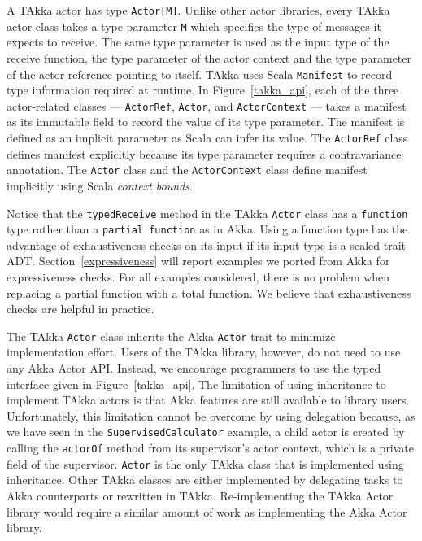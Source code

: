 A TAkka actor has type {\tt Actor[M]}.  Unlike other actor 
libraries, every TAkka actor class takes a type parameter {\tt M} which 
specifies the type of messages it expects to receive.  The same type parameter 
is used as the input type of the receive function, the type parameter of the 
actor context and the type parameter of the actor reference pointing to itself. 
TAkka uses Scala {\tt Manifest} to record type information required at runtime.
In Figure~\ref{takka_api}, each of the three actor-related classes ---
{\tt ActorRef}, {\tt Actor}, and {\tt ActorContext} --- takes a manifest as its
immutable field to record the value of its type parameter.
The manifest is defined as an implicit parameter as Scala can infer its value.
The {\tt ActorRef} class defines manifest explicitly because its
type parameter requires a contravariance annotation.  The {\tt Actor} class
and the {\tt ActorContext} class define manifest implicitly using
Scala {\it context bounds}.  

Notice that the {\tt typedReceive} method in the TAkka {\tt Actor}
class has a {\tt function} type rather than a {\tt partial function} as in Akka.
Using a function type has the advantage of exhaustiveness checks on its input if
its input type is a sealed-trait ADT.  Section~\ref{expressiveness} will report
examples we ported from Akka for expressiveness checks.  For all examples
considered, there is no problem when replacing a partial function with a total function.
We believe that exhaustiveness checks are helpful
in practice.

The TAkka {\tt Actor} class inherits 
the Akka {\tt Actor} trait to minimize implementation effort.  Users of the 
TAkka library, however, do not need to use any Akka Actor API.  Instead, we 
encourage programmers to use the typed interface given in Figure~\ref{takka_api}.  
The limitation of using inheritance to implement TAkka actors 
is that Akka features are still available to library users.  Unfortunately, 
this limitation cannot be overcome by using delegation because, as we have seen 
in the {\tt SupervisedCalculator} example, a child actor is created by calling the {\tt actorOf} method from 
its supervisor's actor context, which is a private field of the supervisor.  
{\tt Actor} is the only TAkka class that is implemented using inheritance. 
Other TAkka classes are either implemented by delegating tasks to Akka 
counterparts or rewritten in TAkka.  Re-implementing the TAkka 
Actor library would require a similar amount of work as implementing the Akka Actor 
library.

